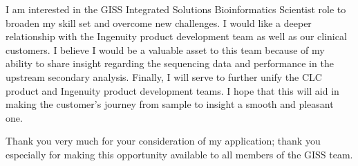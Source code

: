 \documentclass[10pt,letterpaper,sigleft]{newlfm}
\begin{document}
\begin{newlfm}
I am interested in the GISS Integrated Solutions Bioinformatics Scientist role to broaden my skill set and overcome new challenges. I would like a deeper relationship with the Ingenuity product development team as well as our clinical customers. I believe I would be a valuable asset to this team because of my ability to share insight regarding the sequencing data and performance in the upstream secondary analysis. Finally, I will serve to further unify the CLC product and Ingenuity product development teams. I hope that this will aid in making the customer's journey from sample to insight a smooth and pleasant one.

Thank you very much for your consideration of my application; thank you especially for making this opportunity available to all members of the GISS team.



 

\end{newlfm}
\end{document}
